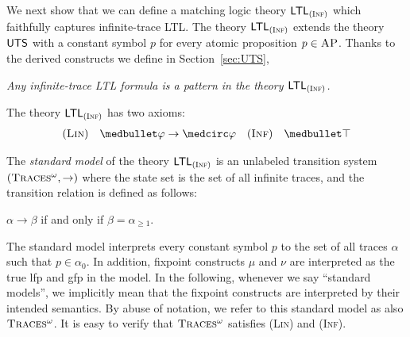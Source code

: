 \documentclass[acmsmall]{acmart}
\newcommand{\imp}{\to}
\newcommand{\AP}{\textsc{AP}}
\newcommand{\wnext}{{\medcirc}}
\newcommand{\snext}{{\medbullet}}
\newcommand{\Us}{\mathbin{\mathsf{U}_s}}
\newcommand{\infTraces}{\textsc{Traces$^\omega$}\xspace}
\newcommand{\MLLTL}{\textnormal{\textsf{LTL}}\xspace}
\newcommand{\MLUTS}{\textnormal{\textsf{UTS}}\xspace}
\newcommand{\MLinfLTL}{\MLLTL_\Inf}
\newcommand{\prule}[1]{\textnormal{(\textsc{#1})}}
\newcommand{\Inf}{\prule{Inf}\xspace}
\newcommand{\Lin}{\prule{Lin}\xspace}
\begin{document}
We next show that we can define 
a matching logic theory $\MLinfLTL$ which
faithfully captures infinite-trace LTL.
The theory $\MLinfLTL$ extends the theory $\MLUTS$
with a constant symbol $p$
for every atomic proposition $p \in \AP$.
Thanks to the derived constructs we define
in Section~\ref{sec:UTS},
\begin{center}
\emph{Any infinite-trace LTL formula is a pattern
 in the theory $\MLinfLTL$.}
\end{center}
%
The theory $\MLLTL_\Inf$ has two axioms:
\begin{align*}
&\prule{Lin} \quad \snext \varphi \imp \wnext \varphi
&\prule{Inf} \quad \snext \top
\end{align*}

The \emph{standard model} of the theory $\MLinfLTL$
is an unlabeled transition system
$(\infTraces, \to)$ where the state set
is the set of all infinite traces, and the
transition relation is defined as follows:
\begin{center}
$\alpha \to \beta$ 
\qquad if and only if \qquad 
$\beta = \alpha_{\ge 1}$.
\end{center}
The standard model interprets every constant symbol $p$
to the set of all traces $\alpha$ such that
$p \in \alpha_0$.
In addition, fixpoint constructs $\mu$ and $\nu$
are interpreted as the true lfp and gfp in the model.
In the following, whenever we say ``standard models'',
we implicitly mean that the fixpoint constructs are
interpreted by their intended semantics.
By abuse of notation, we refer to this standard model
as also $\infTraces$.
It is easy to verify that $\infTraces$ satisfies
\Lin and \Inf.
\end{document}
